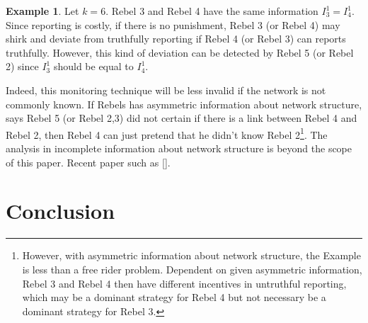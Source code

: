 \documentclass[12pt,letter]{article}
\theoremstyle{definition}
\newtheorem{example}{Example}[section]
\theoremstyle{remark}
\theoremstyle{claim}
\begin{document}
\begin{example}
Let $k=6$. Rebel 3 and Rebel 4 have the same information $I^1_3=I^1_4$. Since reporting is costly, if there is no punishment, Rebel 3 (or Rebel 4) may shirk and deviate from truthfully reporting if Rebel 4 (or Rebel 3) can reports truthfully. However, this kind of deviation can be detected by Rebel 5 (or Rebel 2) since $I^1_3$ should be equal to $I^1_4$. 

\begin{center}
\end{center}


Indeed, this monitoring technique will be less invalid if the network is not commonly known. If Rebels has asymmetric information about network structure, says Rebel 5 (or Rebel 2,3) did not certain if there is a link between Rebel 4 and Rebel 2, then Rebel 4 can just pretend that he didn't know Rebel 2\footnote{However, with asymmetric information about network structure, the Example is less than a free rider problem. Dependent on given asymmetric information, Rebel 3 and Rebel 4 then have different incentives in untruthful reporting, which may be a dominant strategy for Rebel 4 but not necessary be a dominant strategy for Rebel 3.}. The analysis in incomplete information about network structure is beyond the scope of this paper. Recent paper such as [].

\end{example}

















\section{Conclusion}
\label{sec:con}
\end{document}
